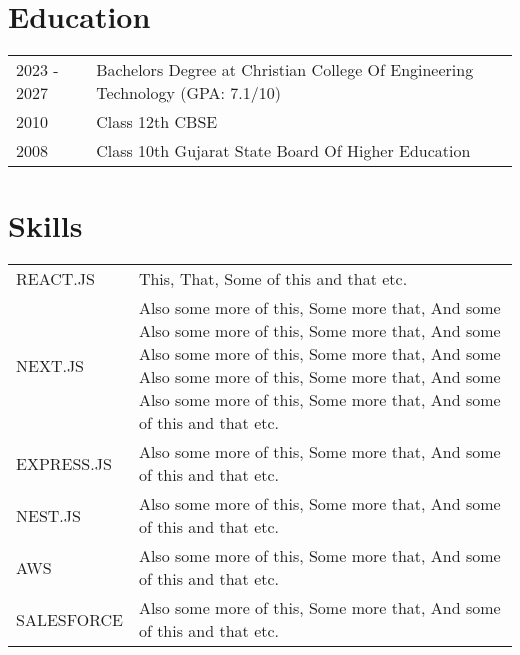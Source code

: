 \documentclass[a4paper,12pt]{article}
\begin{document}
\section{Education}
\begin{tabularx}{\linewidth}{@{}l X@{}}	

2023 - 2027 & Bachelors Degree at Christian College Of Engineering Technology \hfill (GPA: 7.1/10) \\ 

2010 & Class 12th CBSE \hfill   \\

2008 & Class 10th Gujarat State Board Of Higher Education \hfill   \\
\end{tabularx}




\section{Skills}
\begin{tabularx}{\linewidth}{@{}l X@{}}	

REACT.JS &  \normalsize{This, That, Some of this and that etc.}\\
NEXT.JS  &  \normalsize{Also some more of this, Some more that, And some 
Also some more of this, Some more that, And some 
Also some more of this, Some more that, And some 
Also some more of this, Some more that, And some 
Also some more of this, Some more that, And some of this and that etc.}\\ 
EXPRESS.JS  &  \normalsize{Also some more of this, Some more that, And some of this and that etc.}\\ 
NEST.JS  &  \normalsize{Also some more of this, Some more that, And some of this and that etc.}\\ 
AWS  &  \normalsize{Also some more of this, Some more that, And some of this and that etc.}\\ 
SALESFORCE  &  \normalsize{Also some more of this, Some more that, And some of this and that etc.}\\ 
\end{tabularx}

\vfill
{}
\end{document}
